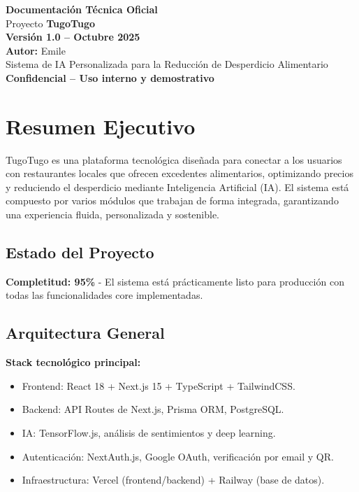 \documentclass[a4paper,12pt]{article}
\begin{document}
\begin{titlepage}
\centering
\vspace*{2cm}
{\Huge \textbf{Documentación Técnica Oficial}}\\[0.5cm]
{\LARGE Proyecto \textbf{TugoTugo}}\\[0.5cm]
{\large \textbf{Versión 1.0 – Octubre 2025}}\\[2cm]
{\Large \textbf{Autor:} Emile}\\[0.2cm]
{\large Sistema de IA Personalizada para la Reducción de Desperdicio Alimentario}\\[2cm]
\vfill
{\large \textbf{Confidencial – Uso interno y demostrativo}}\\
\end{titlepage}

\newpage
\tableofcontents
\newpage

\section{Resumen Ejecutivo}
TugoTugo es una plataforma tecnológica diseñada para conectar a los usuarios con restaurantes locales que ofrecen excedentes alimentarios, optimizando precios y reduciendo el desperdicio mediante Inteligencia Artificial (IA).  
El sistema está compuesto por varios módulos que trabajan de forma integrada, garantizando una experiencia fluida, personalizada y sostenible.

\subsection{Estado del Proyecto}
\textbf{Completitud: 95\%} - El sistema está prácticamente listo para producción con todas las funcionalidades core implementadas.

\subsection{Arquitectura General}
\textbf{Stack tecnológico principal:}
\begin{itemize}
  \item Frontend: React 18 + Next.js 15 + TypeScript + TailwindCSS.
  \item Backend: API Routes de Next.js, Prisma ORM, PostgreSQL.
  \item IA: TensorFlow.js, análisis de sentimientos y deep learning.
  \item Autenticación: NextAuth.js, Google OAuth, verificación por email y QR.
  \item Infraestructura: Vercel (frontend/backend) + Railway (base de datos).
\end{itemize}
\end{document}

